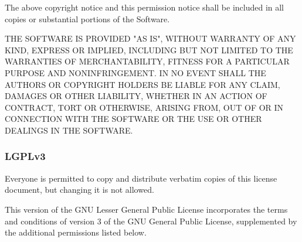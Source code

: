 \documentclass[11pt,a4paper, twoside]{article}
\begin{document}
The above copyright notice and this permission notice shall be
included in all copies or substantial portions of the Software.

THE SOFTWARE IS PROVIDED "AS IS", WITHOUT WARRANTY OF ANY KIND,
EXPRESS OR IMPLIED, INCLUDING BUT NOT LIMITED TO THE WARRANTIES OF
MERCHANTABILITY, FITNESS FOR A PARTICULAR PURPOSE AND
NONINFRINGEMENT. IN NO EVENT SHALL THE AUTHORS OR COPYRIGHT HOLDERS BE
LIABLE FOR ANY CLAIM, DAMAGES OR OTHER LIABILITY, WHETHER IN AN ACTION
OF CONTRACT, TORT OR OTHERWISE, ARISING FROM, OUT OF OR IN CONNECTION
WITH THE SOFTWARE OR THE USE OR OTHER DEALINGS IN THE SOFTWARE.
\newpage
\subsubsection{LGPLv3}
Everyone is permitted to copy and distribute verbatim copies of this license document, but changing it is not allowed.

This version of the GNU Lesser General Public License incorporates the terms and conditions of version 3 of the GNU General Public License, supplemented by the additional permissions listed below.
\end{document}
